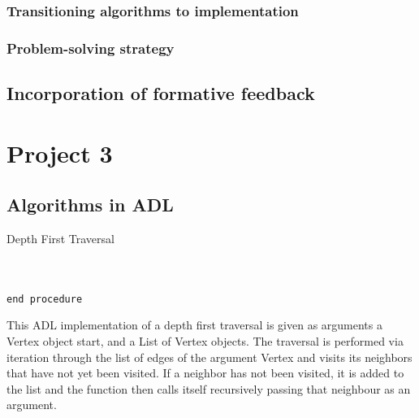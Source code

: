 \documentclass[a4paper]{article}
\begin{document}
\subsubsection{Transitioning algorithms to implementation}
\subsubsection{Problem-solving strategy}

\subsection{Incorporation of formative feedback}





\newpage


\section{Project 3}
\subsection{Algorithms in ADL}

\makeatletter
\renewcommand{\ALG@name}{Algorithm}
\makeatother
\setcounter{algorithm}{0}

\begin{algorithm}
\caption{Depth First Traversal}\label{euclid}
\begin{algorithmic}[1]

 \\
\State{}
\State{}
\State\quad{}
\State\quad{}
\State{}
 \\
{\tt end procedure}

\EndProcedure
\end{algorithmic}
\end{algorithm}

This ADL implementation of a depth first traversal 
is given as arguments
a Vertex object start,
and a List of Vertex objects.
The traversal is performed via
iteration through the list of edges of the argument Vertex
and visits its neighbors that have not yet been visited.
If a neighbor has not been visited, it is added to the list and the function then calls itself 
recursively passing that neighbour as an argument.
\end{document}
